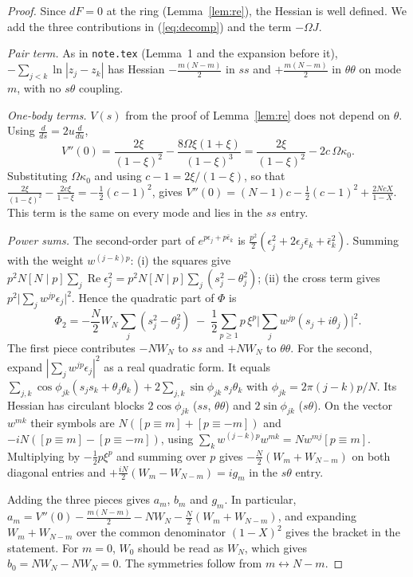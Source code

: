 \documentclass[11pt]{article}
\theoremstyle{remark}
\begin{document}
\begin{proof}
Since $dF=0$ at the ring (Lemma~\ref{lem:re}), the Hessian is well defined. We add the three contributions in
(\ref{eq:decomp}) and the term $-\Omega J$.

\emph{Pair term.} As in \texttt{note.tex} (Lemma~1 and the expansion before it), $-\sum_{j<k}\ln|z_j-z_k|$ has
Hessian $-\frac{m(N-m)}2$ in $ss$ and $+\frac{m(N-m)}2$ in $\theta\theta$ on mode $m$, with no $s\theta$ coupling.

\emph{One-body terms.} $V(s)$ from the proof of Lemma~\ref{lem:re} does not depend on $\theta$. Using
$\frac{d}{ds}=2u\frac{d}{du}$,
\[
V''(0)=\frac{2\xi}{(1-\xi)^2}-\frac{8\Omega\xi(1+\xi)}{(1-\xi)^3}
=\frac{2\xi}{(1-\xi)^2}-2c\,\Omega\kappa_0 .
\]
Substituting $\Omega\kappa_0$ and using $c-1=2\xi/(1-\xi)$, so that $\frac{2\xi}{(1-\xi)^2}-\frac{2c\xi}{1-\xi}=-\frac12(c-1)^2$,
gives $V''(0)=(N-1)c-\frac12(c-1)^2+\frac{2NcX}{1-X}$. This term is the same on every mode and lies in the $ss$ entry.

\emph{Power sums.} The second-order part of $e^{p\epsilon_j+p\bar\epsilon_k}$ is
$\frac{p^2}2(\epsilon_j^2+2\epsilon_j\bar\epsilon_k+\bar\epsilon_k^2)$. Summing with the weight $w^{(j-k)p}$:
(i) the squares give $p^2N[N\mid p]\sum_j\operatorname{Re}\epsilon_j^2=p^2N[N\mid p]\sum_j(s_j^2-\theta_j^2)$;
(ii) the cross term gives $p^2\big|\sum_jw^{jp}\epsilon_j\big|^2$. Hence the quadratic part of $\Phi$ is
\[
\Phi_2=-\frac N2W_N\sum_j(s_j^2-\theta_j^2)\;-\;\frac12\sum_{p\ge1}p\,\xi^p\Big|\sum_jw^{jp}(s_j+i\theta_j)\Big|^2 .
\]
The first piece contributes $-NW_N$ to $ss$ and $+NW_N$ to $\theta\theta$. For the second, expand
$|\sum_jw^{jp}\epsilon_j|^2$ as a real quadratic form. It equals $\sum_{j,k}\cos\phi_{jk}(s_js_k+\theta_j\theta_k)+2\sum_{j,k}\sin\phi_{jk}\,s_j\theta_k$
with $\phi_{jk}=2\pi(j-k)p/N$. Its Hessian has circulant blocks $2\cos\phi_{jk}$ ($ss$, $\theta\theta$) and $2\sin\phi_{jk}$ ($s\theta$).
On the vector $w^{mk}$ their symbols are $N([p\equiv m]+[p\equiv-m])$ and $-iN([p\equiv m]-[p\equiv-m])$, using
$\sum_kw^{(j-k)p}w^{mk}=Nw^{mj}[p\equiv m]$. Multiplying by $-\frac12p\xi^p$ and summing over $p$ gives
$-\frac N2(W_m+W_{N-m})$ on both diagonal entries and $+\frac{iN}2(W_m-W_{N-m})=ig_m$ in the $s\theta$ entry.

Adding the three pieces gives $a_m$, $b_m$ and $g_m$. In particular,
$a_m=V''(0)-\frac{m(N-m)}2-NW_N-\frac N2(W_m+W_{N-m})$, and expanding $W_m+W_{N-m}$ over the common denominator
$(1-X)^2$ gives the bracket in the statement. For $m=0$, $W_0$ should be read as $W_N$, which gives $b_0=NW_N-NW_N=0$.
The symmetries follow from $m\leftrightarrow N-m$.
\end{proof}
\end{document}
